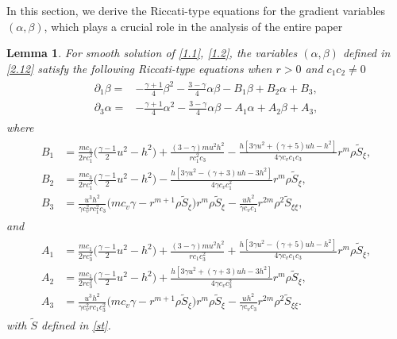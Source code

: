 \documentclass[11pt,reqno]{article}
\newtheorem{lem}{Lemma}[section]
\newcommand{\fr}{\frac}
\newcommand{\pa}{\partial}
\numberwithin{equation}{section}
\begin{document}
In this section, we derive the Riccati-type equations for the gradient variables $(\alpha,\beta)$, which plays a crucial role in the analysis of the entire paper

\begin{lem}\label{lem1}
For smooth solution of \eqref{1.1}, \eqref{1.2}, the variables $(\alpha, \beta)$ defined in \eqref{2.12} satisfy the following Riccati-type equations when $r>0$ and $c_1c_2\neq 0$
\begin{align}\label{3.1}
\begin{split}
\pa_1 \beta =& -\frac{\gamma+1}{4} \beta^{2}
  -\frac{3-\gamma}{4} \alpha \beta-B_{1}\beta+ B_{2} \alpha +B_3, \\[4pt]
\pa_3 \alpha =& -\frac{\gamma+1}{4} \alpha^{2}
  -\frac{3-\gamma}{4} \alpha \beta-A_{1}\alpha+ A_{2} \beta +A_3,
\end{split}
\end{align}
where
\begin{align}\label{3.2}
\begin{split}
B_{1} &=\fr{mc_3}{2rc_{1}^2}\Big(\fr{\gamma-1}{2}u^2-h^2\Big) +\fr{(3-\gamma)mu^2h^2}{rc_{1}^2c_3} -\fr{h[3\gamma u^2+(\gamma+5)uh-h^2]}{4\gamma c_v c_1c_3}r^m\rho \widetilde{S}_\xi,   \\
B_{2} &=\fr{mc_3}{2rc_{1}^2}\Big(\fr{\gamma-1}{2}u^2-h^2\Big) -\fr{h[3\gamma u^2-(\gamma+3)uh-3h^2]}{4\gamma c_v c_{1}^2}r^m\rho \widetilde{S}_\xi,    \\
B_{3} &=\fr{u^3h^2}{\gamma c_{v}^2 r c_{1}^2 c_{3}}\Big(mc_v\gamma -r^{m+1}\rho \widetilde{S}_\xi\Big) r^m\rho \widetilde{S}_\xi -\fr{uh^2}{\gamma c_v c_1}r^{2m}\rho^2\widetilde{S}_{\xi\xi},
\end{split}
\end{align}
and
\begin{align}\label{3.3}
\begin{split}
A_{1} &=\fr{mc_1}{2rc_{3}^2}\Big(\fr{\gamma-1}{2}u^2-h^2\Big) +\fr{(3-\gamma)mu^2h^2}{rc_{1}c_{3}^2} +\fr{h[3\gamma u^2-(\gamma+5)uh-h^2]}{4\gamma c_v c_1c_3}r^m\rho \widetilde{S}_\xi,   \\
A_{2} &=\fr{mc_1}{2rc_{3}^2}\Big(\fr{\gamma-1}{2}u^2-h^2\Big) +\fr{h[3\gamma u^2+(\gamma+3)uh-3h^2]}{4\gamma c_v c_{3}^2}r^m\rho \widetilde{S}_\xi,    \\
A_{3} &=\fr{u^3h^2}{\gamma c_{v}^2 rc_{1}c_{3}^2}\Big(mc_v\gamma -r^{m+1}\rho \widetilde{S}_\xi\Big) r^m\rho \widetilde{S}_\xi -\fr{uh^2}{\gamma c_v c_3}r^{2m}\rho^2\widetilde{S}_{\xi\xi}.
\end{split}
\end{align}
with $\widetilde{S}$ defined in \eqref{st}.
\end{lem}
\end{document}
